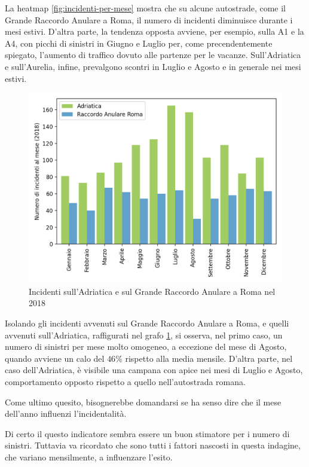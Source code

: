 \documentclass[a4paper,12pt]{report}
\begin{document}
La heatmap \ref{fig:incidenti-per-mese} mostra che su alcune autostrade, come il 
Grande Raccordo Anulare a Roma, il numero di incidenti diminuisce durante i mesi 
estivi.
D'altra parte, la tendenza opposta avviene, per esempio, sulla A1 e la A4, 
con picchi di sinistri in Giugno e Luglio per, come precendentemente spiegato, 
l'aumento di traffico dovuto alle partenze per le vacanze.
Sull'Adriatica e sull'Aurelia, infine, prevalgono scontri 
in Luglio e Agosto e in generale nei mesi estivi.

\begin{figure}
    \includegraphics[width=\linewidth]{../src/incidenti/incidenti_aci/autostrade/adriatica_roma.png}
    \caption{Incidenti sull'Adriatica e sul Grande Raccordo Anulare a Roma nel 2018}
    \label{fig:adriatica-roma}
\end{figure}

Isolando gli incidenti avvenuti sul Grande Raccordo Anulare a Roma, e quelli avvenuti 
sull'Adriatica, raffigurati nel grafo \ref{fig:adriatica-roma}, si osserva, 
nel primo caso, un numero di sinistri per mese molto omogeneo, a eccezione del 
mese di Agosto, quando avviene un calo del $46$\% rispetto alla media mensile. 
D'altra parte, nel caso dell'Adriatica, è visibile una campana con apice nei 
mesi di Luglio e Agosto, comportamento opposto rispetto a quello nell'autostrada 
romana.

Come ultimo quesito, bisognerebbe domandarsi se ha senso dire che il mese dell'anno 
influenzi l'incidentalità. 

Di certo il questo indicatore sembra essere un buon stimatore 
per i numero di sinistri.
Tuttavia va ricordato che sono tutti i fattori 
nascosti in questa indagine, che variano mensilmente, a influenzare l'esito. 
\end{document}
